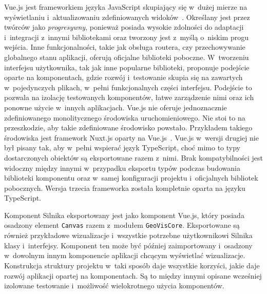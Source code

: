 Vue.js jest frameworkiem języka JavaScript skupiający się w~dużej mierze na wyświetlaniu i~aktualizowaniu zdefiniowanych widoków~\cite{Vue}. Określany jest przez twórców jako \textit{progresywny}, ponieważ posiada wysokie zdolności do adaptacji i~integracji z~innymi bibliotekami oraz tworzony jest z~myślą o~niskim progu wejścia. Inne funkcjonalności, takie jak obsługa routera, czy przechowywanie globalnego stanu aplikacji, oferują oficjalne biblioteki poboczne. W~tworzeniu interfejsu użytkownika, tak jak inne popularne biblioteki, proponuje podejście oparte na komponentach, gdzie rozwój i~testowanie skupia się na zawartych w~pojedynczych plikach, w~pełni funkcjonalnych części interfejsu. Podejście to pozwala na izolację testowanych komponentów, łatwe zarządzenie nimi oraz ich ponowne użycie w~innych aplikacjach. Vue.js nie oferuje jednoznacznie zdefiniowanego monolitycznego środowiska uruchomieniowego. Nie stoi to na przeszkodzie, aby takie zdefiniowane środowisko powstało. Przykładem takiego środowiska jest framework Nuxt.js oparty na Vue.js~\cite{Nuxt}. Vue.js w~wersji drugiej nie był pisany tak, aby w~pełni wspierać język TypeScript, choć mimo to typy dostarczonych obiektów są eksportowane razem z~nimi. Brak kompatybilności jest widoczny między innymi w~przypadku eksportu typów podczas budowania biblioteki komponentu oraz w~samej konfiguracji projektu i~oficjalnych bibliotek pobocznych. Wersja trzecia frameworka została kompletnie oparta na języku TypeScript. 

Komponent Silnika eksportowany jest jako komponent Vue.js, który posiada osadzony element \texttt{Canvas} razem z~modułem \texttt{GeoVisCore}. Eksportowane są również przykładowe wizualizacje i~wszystkie potrzebne użytkownikowi Silnika klasy i~interfejsy. Komponent ten może być później zaimportowany i~osadzony w~dowolnym innym komponencie aplikacji chcącym wyświetlać wizualizacje. Konstrukcja struktury projektu w~taki sposób daje wszystkie korzyści, jakie daje rozwój aplikacji opartej na komponentach. Są to między innymi opisane wcześniej izolowane testowanie i~możliwość wielokrotnego użycia komponentów. 

